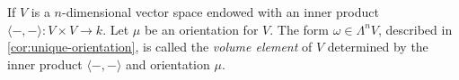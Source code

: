 \begin{definition}
    \label{def:volume-element-vector-space}
    If \(V\) is a \(n\)-dimensional vector space endowed with an inner product
    \(\langle -, - \rangle: V \times V \to k\). Let \(\mu\) be an orientation for
    \(V\). The form \(\omega \in \Lambda^n V\), described in
    \cref{cor:unique-orientation}, is called the \emph{volume element} of \(V\)
    determined by the inner product \(\langle -, - \rangle\) and orientation
    \(\mu\).
\end{definition}


